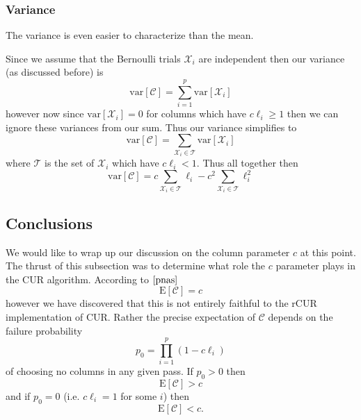 \documentclass{book}
\begin{document}
\subsubsection{Variance}
The variance is even easier to characterize than the mean. 

Since we assume that the Bernoulli trials $\mathscr{X}_i$ are independent then our variance (as discussed before) is
$$
\text{var}\left[\mathscr{C}\right] = \sum_{i=1}^{p}\text{var}\left[\mathscr{X}_i\right]
$$
however now since $\text{var}\left[\mathscr{X}_i\right] = 0$ for columns which have $c\ell_i \geq 1$ then we can ignore these variances from our sum. Thus our variance simplifies to
$$
\text{var}\left[\mathscr{C}\right] = \sum_{\mathscr{X}_i \in \mathcal{T}}\text{var}\left[\mathscr{X}_i\right]
$$
where $\mathcal{T}$ is the set of $\mathscr{X}_i$ which have $c\ell_i < 1$. Thus all together then 
$$
\text{var}\left[\mathscr{C}\right] = c\sum_{\mathscr{X}_i \in \mathcal{T}}\ell_i-c^2\sum_{\mathscr{X}_i \in \mathcal{T}}\ell_i^2
$$


\subsection{Conclusions}

We would like to wrap up our discussion on the column parameter $c$ at this point. The thrust of this subsection was to determine what role the $c$ parameter plays in the CUR algorithm. According to $\cite{pnas}$ 
$$
\text{E}\left[\mathscr{C}\right]=c
$$
however we have discovered that this is not entirely faithful to the rCUR implementation of CUR. Rather the precise expectation of $\mathscr{C}$ depends on the failure probability
$$
p_0=\prod_{i=1}^{p}(1-c\ell_i)
$$
of choosing no columns in any given pass. If $p_0>0$ then 
$$
\text{E}\left[\mathscr{C}\right]>c
$$
and if $p_0 = 0$ (i.e. $c\ell_i=1$ for some $i$) then 
$$
\text{E}\left[\mathscr{C}\right]<c.
$$
\end{document}
